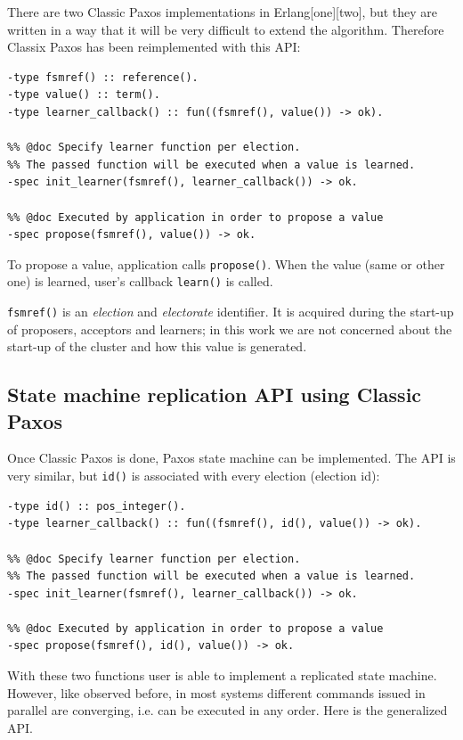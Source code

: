 \documentclass[english,11pt]{article}
\begin{document}
There are two Classic Paxos implementations in Erlang[one][two], but they are
written in a way that it will be very difficult to extend the algorithm.
Therefore Classix Paxos has been reimplemented with this API:

\begin{verbatim}
-type fsmref() :: reference().
-type value() :: term().
-type learner_callback() :: fun((fsmref(), value()) -> ok).

%% @doc Specify learner function per election.
%% The passed function will be executed when a value is learned.
-spec init_learner(fsmref(), learner_callback()) -> ok.

%% @doc Executed by application in order to propose a value
-spec propose(fsmref(), value()) -> ok.
\end{verbatim}

To propose a value, application calls {\tt propose()}. When the value (same or
other one) is learned, user's callback {\tt learn()} is called.

{\tt fsmref()} is an \emph{election} and \emph{electorate} identifier. It is
acquired during the start-up of proposers, acceptors and learners; in this work
we are not concerned about the start-up of the cluster and how this value is
generated.

\subsection{State machine replication API using Classic Paxos}

Once Classic Paxos is done, Paxos state machine can be implemented. The API is
very similar, but {\tt id()} is associated with every election (election id):

\begin{verbatim}
-type id() :: pos_integer().
-type learner_callback() :: fun((fsmref(), id(), value()) -> ok).

%% @doc Specify learner function per election.
%% The passed function will be executed when a value is learned.
-spec init_learner(fsmref(), learner_callback()) -> ok.

%% @doc Executed by application in order to propose a value
-spec propose(fsmref(), id(), value()) -> ok.
\end{verbatim}

With these two functions user is able to implement a replicated state machine.
However, like observed before, in most systems different commands issued in
parallel are converging, i.e. can be executed in any order. Here is the
generalized API.
\end{document}
